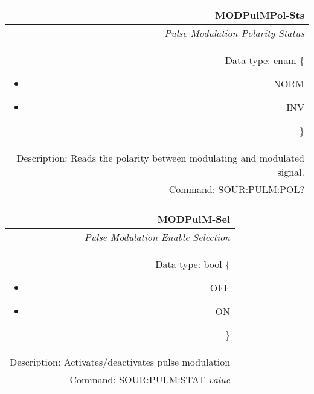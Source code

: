 \documentclass[openany]{article}
\begin{document}
		\begin{tabular}{N}
			\hline
			\bfseries MODPulMPol-Sts \\ \hline
			\emph{Pulse Modulation Polarity Status} \\
			Data type: enum \{\begin{itemize}[noitemsep]
				\small
				\item[] NORM
				\item[] INV
			\end{itemize}\} \\ 
			Description: Reads the polarity between modulating and modulated signal. \\
			Command: SOUR:PULM:POL? \\

		\end{tabular}
%
		\begin{tabular}{N}
			\hline
			\bfseries MODPulM-Sel \\ \hline
			\emph{Pulse Modulation Enable Selection} \\
			Data type: bool \{\begin{itemize}[noitemsep]
				\small
				\item[] OFF
				\item[] ON
			\end{itemize}\} \\
			Description: Activates/deactivates pulse modulation\\
			Command: SOUR:PULM:STAT \emph{value} \\

		\end{tabular}
\end{document}
